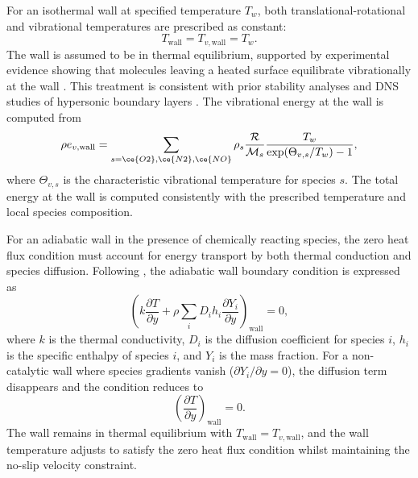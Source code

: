 For an isothermal wall at specified temperature $T_w$, both translational-rotational and vibrational temperatures are prescribed as constant:
\begin{equation}
T_{\text{wall}} = T_{v,\text{wall}} = T_w.
\end{equation}
The wall is assumed to be in thermal equilibrium, supported by experimental evidence showing that molecules leaving a heated surface equilibrate vibrationally at the wall \citep{Park1990,CandlerNompelis2021}. This treatment is consistent with prior stability analyses \citep{Hudson1997,Bitter2015} and DNS studies of hypersonic boundary layers \citep{Passiatoreetal2021,DiRenzo2021}. The vibrational energy at the wall is computed from
\begin{equation}\label{equation:evs}
\rho e_{v,\text{wall}} = \sum_{s=\ce{O2}, \ce{N2}, \ce{NO}} \rho_s \frac{\mathcal{R}}{\mathcal{M}_s} \frac{T_w}{\exp(\Theta_{v,s}/T_w) - 1},
\end{equation}
where $\Theta_{v,s}$ is the characteristic vibrational temperature for species $s$. The total energy at the wall is computed consistently with the prescribed temperature and local species composition.


For an adiabatic wall in the presence of chemically reacting species, the zero heat flux condition must account for energy transport by both thermal conduction and species diffusion. Following \citet{Anderson2019}, the adiabatic wall boundary condition is expressed as
\begin{equation}
\left( k \frac{\partial T}{\partial y} + \rho \sum_i D_i h_i \frac{\partial Y_i}{\partial y} \right)_{\text{wall}} = 0,
\end{equation}
where $k$ is the thermal conductivity, $D_i$ is the diffusion coefficient for species $i$, $h_i$ is the specific enthalpy of species $i$, and $Y_i$ is the mass fraction. For a non-catalytic wall where species gradients vanish ($\partial Y_i/\partial y = 0$), the diffusion term disappears and the condition reduces to
\begin{equation}
\left( \frac{\partial T}{\partial y} \right)_{\text{wall}} = 0.
\end{equation}
The wall remains in thermal equilibrium with $T_{\text{wall}} = T_{v,\text{wall}}$, and the wall temperature adjusts to satisfy the zero heat flux condition whilst maintaining the no-slip velocity constraint.

